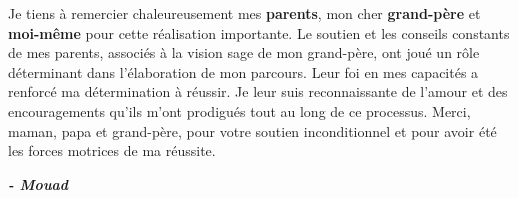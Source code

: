 
\begin{fquote}
\begin{center}
\large{
    Je tiens à remercier chaleureusement mes \textbf{parents}, mon cher \textbf{grand-père} et \textbf{moi-même} pour cette réalisation importante. Le soutien et les conseils constants de mes parents, associés à la vision sage de mon grand-père, ont joué un rôle déterminant dans l'élaboration de mon parcours. Leur foi en mes capacités a renforcé ma détermination à réussir. Je leur suis reconnaissante de l'amour et des encouragements qu'ils m'ont prodigués tout au long de ce processus. Merci, maman, papa et grand-père, pour votre soutien inconditionnel et pour avoir été les forces motrices de ma réussite.
}
\end{center}
\bigskip
\medskip
\end{fquote}

\begin{adjustwidth}{2cm}{1cm}
\hspace*{\fill} \textbf{\textit{\large{- Mouad}}}
\end{adjustwidth}

\clearpage